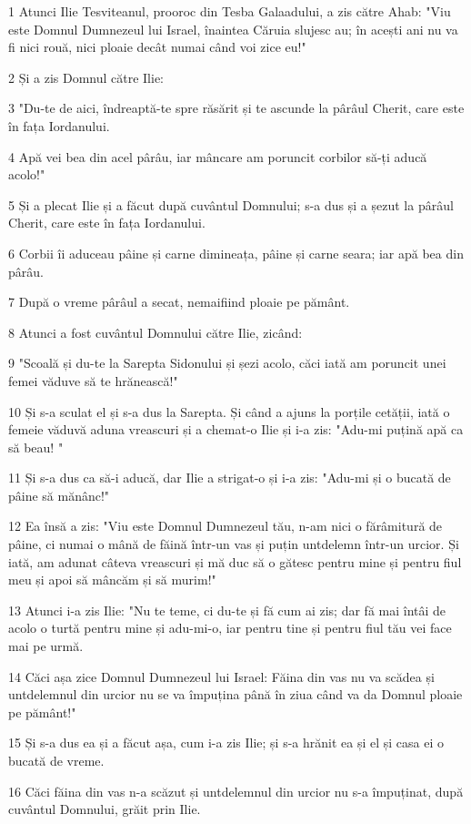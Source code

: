 \par 1 Atunci Ilie Tesviteanul, prooroc din Tesba Galaadului, a zis către Ahab: "Viu este Domnul Dumnezeul lui Israel, înaintea Căruia slujesc au; în acești ani nu va fi nici rouă, nici ploaie decât numai când voi zice eu!"
\par 2 Și a zis Domnul către Ilie:
\par 3 "Du-te de aici, îndreaptă-te spre răsărit și te ascunde la pârâul Cherit, care este în fața Iordanului.
\par 4 Apă vei bea din acel pârâu, iar mâncare am poruncit corbilor să-ți aducă acolo!"
\par 5 Și a plecat Ilie și a făcut după cuvântul Domnului; s-a dus și a șezut la pârâul Cherit, care este în fața Iordanului.
\par 6 Corbii îi aduceau pâine și carne dimineața, pâine și carne seara; iar apă bea din pârâu.
\par 7 După o vreme pârâul a secat, nemaifiind ploaie pe pământ.
\par 8 Atunci a fost cuvântul Domnului către Ilie, zicând:
\par 9 "Scoală și du-te la Sarepta Sidonului și șezi acolo, căci iată am poruncit unei femei văduve să te hrănească!"
\par 10 Și s-a sculat el și s-a dus la Sarepta. Și când a ajuns la porțile cetății, iată o femeie văduvă aduna vreascuri și a chemat-o Ilie și i-a zis: "Adu-mi puțină apă ca să beau! "
\par 11 Și s-a dus ca să-i aducă, dar Ilie a strigat-o și i-a zis: "Adu-mi și o bucată de pâine să mănânc!"
\par 12 Ea însă a zis: "Viu este Domnul Dumnezeul tău, n-am nici o fărâmitură de pâine, ci numai o mână de făină într-un vas și puțin untdelemn într-un urcior. Și iată, am adunat câteva vreascuri și mă duc să o gătesc pentru mine și pentru fiul meu și apoi să mâncăm și să murim!"
\par 13 Atunci i-a zis Ilie: "Nu te teme, ci du-te și fă cum ai zis; dar fă mai întâi de acolo o turtă pentru mine și adu-mi-o, iar pentru tine și pentru fiul tău vei face mai pe urmă.
\par 14 Căci așa zice Domnul Dumnezeul lui Israel: Făina din vas nu va scădea și untdelemnul din urcior nu se va împuțina până în ziua când va da Domnul ploaie pe pământ!"
\par 15 Și s-a dus ea și a făcut așa, cum i-a zis Ilie; și s-a hrănit ea și el și casa ei o bucată de vreme.
\par 16 Căci făina din vas n-a scăzut și untdelemnul din urcior nu s-a împuținat, după cuvântul Domnului, grăit prin Ilie.
